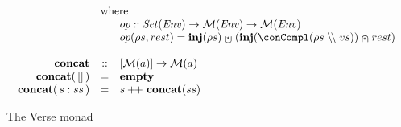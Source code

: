 \begin{figure}
$$\begin{array}{l}
\begin{array}{rcl}
    & \multicolumn{2}{l}{\text{where}} \\
    && \begin{array}[t]{@{}l}
         op :: \powerset{\Env} \rightarrow \Vm{\Env} \rightarrow \Vm{\Env} \\
         op( \rho{}s, rest ) = \vminject( \rho{}s ) \vminnerunion (\vminject( \conCompl( \rho{}s \ENVhide vs )) \vmseq rest )
       \end{array} \\
\\
    \vmconcat & :: & [\Vm{a}] \rightarrow \Vm{a} \\
    \vmconcat(\, [] \, ) & = & \vmempty \\
    \vmconcat(\, s:ss \, ) & = & s \vmcat \vmconcat(ss) \\
    \end{array}

\end{array}
$$
\caption{The Verse monad}
\end{figure}

%
%

